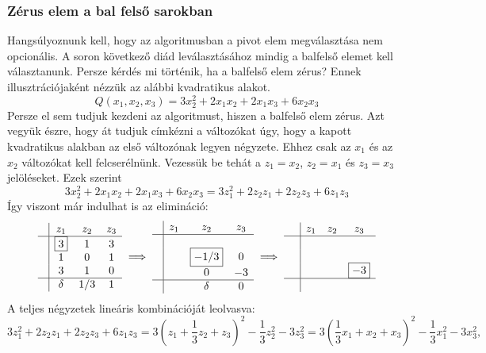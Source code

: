 \documentclass[9pt, a4paper, showtrims]{memoir}
\theoremstyle{plain}
\theoremstyle{remark}
\theoremstyle{definition}
\begin{document}
\subsubsection{Zérus elem a bal felső sarokban}
Hangsúlyoznunk kell, hogy az algoritmusban a pivot elem megválasztása nem opcionális. 
A soron következő diád leválasztásához mindig a balfelső elemet kell választanunk.
Persze kérdés mi történik, ha a balfelső elem zérus?
Ennek illusztrációjaként nézzük az alábbi kvadratikus alakot.
\[
    Q\left( x_1,x_2,x_3 \right)=
    3x_2^2+
    2x_1x_2+2x_1x_3+
    6x_2x_3
\]
Persze el sem tudjuk kezdeni az algoritmust, hiszen a balfelső elem zérus.
Azt vegyük észre, hogy át tudjuk címkézni a változókat úgy, 
hogy a kapott kvadratikus alakban az első változónak legyen négyzete.
Ehhez csak az $x_1$ és az $x_2$ változókat kell felcserélnünk.
Vezessük be tehát a $z_1=x_2$, $z_2=x_1$ és $z_3=x_3$ jelöléseket.
Ezek szerint 
\[
    3x_2^2+
    2x_1x_2+2x_1x_3+
    6x_2x_3
    =
    3z_1^2+
    2z_2z_1+2z_2z_3+
    6z_1z_3
\]
Így viszont már indulhat is az elimináció:
\[
\begin{array}{c|ccc}
     & z_1       & z_2 & z_3 \\
     \hline
     & \boxed{3} & 1   & 3   \\
     & 1         & 0   & 1   \\
     & 3         & 1   & 0   \\
    \hline
    & \delta     & 1/3   & 1 
\end{array}
\implies
\begin{array}{c|ccc}
     & z_1& z_2  & z_3 \\
     \hline
     & &                &     \\
     & & \boxed{-1/3}      & 0   \\
     & & 0              & -3   \\
     \hline
     & & \delta         & 0
\end{array}
\implies
\begin{array}{c|ccc}
     & z_1 & z_2 & z_3      \\
     \hline
     &     &     &          \\
     &     &     &          \\
     &     &     & \boxed{-3}\\
    \hline
    \phantom{\delta}
\end{array}
\]
A teljes négyzetek lineáris kombinációját leolvasva:
\[
    3z_1^2+
    2z_2z_1+2z_2z_3+
    6z_1z_3
    =
    3\left( z_1+\frac{1}{3}z_2+z_3 \right)^2-\frac{1}{3}z_2^2-3z_3^2
    =
    3\left( \frac{1}{3}x_1+x_2+x_3 \right)^2-\frac{1}{3}x_1^2-3x_3^2,
\]
\end{document}
